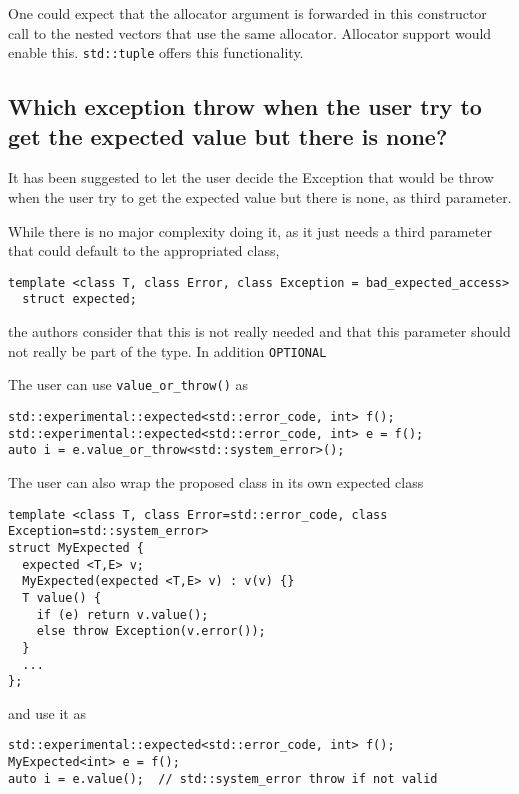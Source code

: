 \documentclass[a4paper,10pt]{article}
\newcommand{\cpp}[1]{\lstinline{#1}}
\begin{document}
One could expect that the allocator argument is forwarded in this constructor call to the nested vectors that use the same allocator. Allocator support would enable this. \cpp{std::tuple} offers this functionality.

\subsection{Which exception throw when the user try to get the expected value but there is none?}

It has been suggested to let the user decide the Exception that would be throw when the user try to get the expected value but there is none, as third parameter. 

While there is no major complexity doing it, as it just needs a third parameter that could default to the appropriated class, 

\begin{lstlisting}
template <class T, class Error, class Exception = bad_expected_access>
  struct expected;
\end{lstlisting}

the authors consider that this is not really needed and that this parameter should not really be part of the type. In addition \cpp{OPTIONAL}

The user can use \cpp{value_or_throw()} as

\begin{lstlisting}
std::experimental::expected<std::error_code, int> f();
std::experimental::expected<std::error_code, int> e = f();
auto i = e.value_or_throw<std::system_error>();  
\end{lstlisting}

The user can also wrap the proposed class in its own expected class

\begin{lstlisting}
template <class T, class Error=std::error_code, class Exception=std::system_error>
struct MyExpected {
  expected <T,E> v;
  MyExpected(expected <T,E> v) : v(v) {}
  T value() {  
    if (e) return v.value();
    else throw Exception(v.error());
  }
  ...
};
\end{lstlisting}

and use it as

\begin{lstlisting}
std::experimental::expected<std::error_code, int> f();
MyExpected<int> e = f();
auto i = e.value();  // std::system_error throw if not valid
\end{lstlisting}
\end{document}

